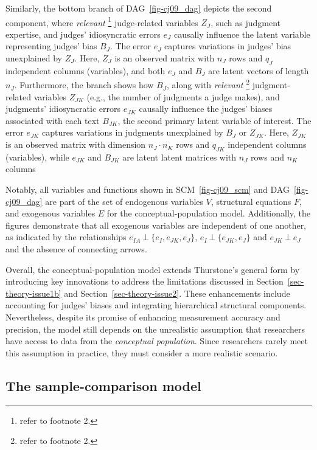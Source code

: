 \documentclass[
  authoryear,
  review,
  1p]{elsarticle}
\begin{document}
Similarly, the bottom branch of DAG~\ref{fig-cj09_dag} depicts the
second component, where \emph{relevant} \footnote{refer to footnote 2.}
judge-related variables \(Z_{J}\), such as judgment expertise, and
judges' idiosyncratic errors \(e_{J}\) causally influence the latent
variable representing judges' bias \(B_{J}\). The error \(e_{J}\)
captures variations in judges' bias unexplained by \(Z_{J}\). Here,
\(Z_{J}\) is an observed matrix with \(n_{J}\) rows and \(q_{J}\)
independent columns (variables), and both \(e_{J}\) and \(B_{J}\) are
latent vectors of length \(n_{J}\). Furthermore, the branch shows how
\(B_{J}\), along with \emph{relevant} \footnote{refer to footnote 2.}
judgment-related variables \(Z_{JK}\) (e.g., the number of judgments a
judge makes), and judgments' idiosyncratic errors \(e_{JK}\) causally
influence the judges' biases associated with each text \(B_{JK}\), the
second primary latent variable of interest. The error \(e_{JK}\)
captures variations in judgments unexplained by \(B_{J}\) or \(Z_{JK}\).
Here, \(Z_{JK}\) is an observed matrix with dimension
\(n_{J} \cdot n_{K}\) rows and \(q_{JK}\) independent columns
(variables), while \(e_{JK}\) and \(B_{JK}\) are latent latent matrices
with \(n_{J}\) rows and \(n_{K}\) columns

Notably, all variables and functions shown in SCM~\ref{fig-cj09_scm} and
DAG~\ref{fig-cj09_dag} are part of the set of endogenous variables
\(V\), structural equations \(F\), and exogenous variables \(E\) for the
conceptual-population model. Additionally, the figures demonstrate that
all exogenous variables are independent of one another, as indicated by
the relationships \(e_{IA} \:\bot\:\{ e_{I}, e_{JK}, e_{J} \}\),
\(e_{I} \:\bot\:\{ e_{JK}, e_{J} \}\) and \(e_{JK} \:\bot\:e_{J}\) and
the absence of connecting arrows.

Overall, the conceptual-population model extends Thurstone's general
form by introducing key innovations to address the limitations discussed
in Section~\ref{sec-theory-issue1b} and Section~\ref{sec-theory-issue2}.
These enhancements include accounting for judges' biases and integrating
hierarchical structural components. Nevertheless, despite its promise of
enhancing measurement accuracy and precision, the model still depends on
the unrealistic assumption that researchers have access to data from the
\emph{conceptual population}. Since researchers rarely meet this
assumption in practice, they must consider a more realistic scenario.

\subsection{The sample-comparison
model}\label{sec-theory-theoretical_SC}
\end{document}
